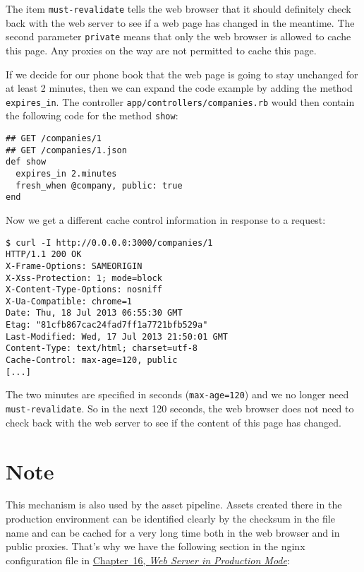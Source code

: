 \documentclass[a4paper]{book}
\begin{document}
The item \texttt{must-revalidate} tells the web browser that it should definitely check back with the web server to see if a web page has changed in the meantime. The second parameter \texttt{private} means that only the web browser is allowed to cache this page. Any proxies on the way are not permitted to cache this page.

If we decide for our phone book that the web page is going to stay unchanged for at least 2 minutes, then we can expand the code example by adding the method \texttt{expires\_in}. The controller \texttt{app/controllers/companies.rb} would then contain the following code for the method \texttt{show}:

\begin{shaded}\begin{verbatim}
## GET /companies/1
## GET /companies/1.json
def show
  expires_in 2.minutes
  fresh_when @company, public: true
end
\end{verbatim}\end{shaded}

Now we get a different cache control information in response to a request:

\begin{shaded}\begin{verbatim}
$ curl -I http://0.0.0.0:3000/companies/1
HTTP/1.1 200 OK
X-Frame-Options: SAMEORIGIN
X-Xss-Protection: 1; mode=block
X-Content-Type-Options: nosniff
X-Ua-Compatible: chrome=1
Date: Thu, 18 Jul 2013 06:55:30 GMT
Etag: "81cfb867cac24fad7ff1a7721bfb529a"
Last-Modified: Wed, 17 Jul 2013 21:50:01 GMT
Content-Type: text/html; charset=utf-8
Cache-Control: max-age=120, public
[...]
\end{verbatim}\end{shaded}

The two minutes are specified in seconds (\texttt{max-age=120}) and we no longer need \texttt{must-revalidate}. So in the next 120 seconds, the web browser does not need to check back with the web server to see if the content of this page has changed.

\section{Note}\label{note-53}

This mechanism is also used by the asset pipeline. Assets created there in the production environment can be identified clearly by the checksum in the file name and can be cached for a very long time both in the web browser and in public proxies. That's why we have the following section in the nginx configuration file in \hyperref[railsux5fproductionux5fwebserver]{Chapter~16, \emph{Web Server in Production Mode}}:
\end{document}
